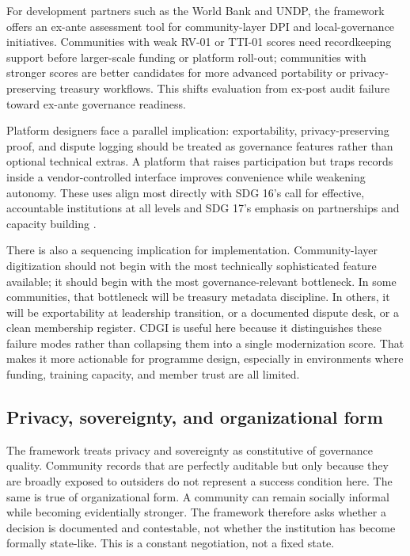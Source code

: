 \documentclass[sigconf,anonymous]{acmart}
\begin{document}
For development partners such as the World Bank and UNDP, the framework offers an ex-ante assessment tool for community-layer DPI and local-governance initiatives. Communities with weak RV-01 or TTI-01 scores need recordkeeping support before larger-scale funding or platform roll-out; communities with stronger scores are better candidates for more advanced portability or privacy-preserving treasury workflows. This shifts evaluation from ex-post audit failure toward ex-ante governance readiness.

Platform designers face a parallel implication: exportability, privacy-preserving proof, and dispute logging should be treated as governance features rather than optional technical extras. A platform that raises participation but traps records inside a vendor-controlled interface improves convenience while weakening autonomy. These uses align most directly with SDG 16's call for effective, accountable institutions at all levels and SDG 17's emphasis on partnerships and capacity building \cite{un2015}.

There is also a sequencing implication for implementation. Community-layer digitization should not begin with the most technically sophisticated feature available; it should begin with the most governance-relevant bottleneck. In some communities, that bottleneck will be treasury metadata discipline. In others, it will be exportability at leadership transition, or a documented dispute desk, or a clean membership register. CDGI is useful here because it distinguishes these failure modes rather than collapsing them into a single modernization score. That makes it more actionable for programme design, especially in environments where funding, training capacity, and member trust are all limited.

\subsection{Privacy, sovereignty, and organizational form}

The framework treats privacy and sovereignty as constitutive of governance quality. Community records that are perfectly auditable but only because they are broadly exposed to outsiders do not represent a success condition here. The same is true of organizational form. A community can remain socially informal while becoming evidentially stronger. The framework therefore asks whether a decision is documented and contestable, not whether the institution has become formally state-like. This is a constant negotiation, not a fixed state.
\end{document}
